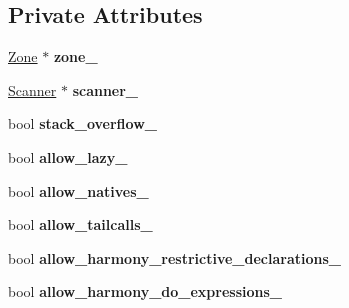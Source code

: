 \subsection*{Private Attributes}
\begin{DoxyCompactItemize}
\item 
\hyperlink{classv8_1_1internal_1_1_zone}{Zone} $\ast$ {\bfseries zone\+\_\+}\hypertarget{classv8_1_1internal_1_1_parser_base_a8bd81faa574f7a7b338ce703bf5e2490}{}\label{classv8_1_1internal_1_1_parser_base_a8bd81faa574f7a7b338ce703bf5e2490}

\item 
\hyperlink{classv8_1_1internal_1_1_scanner}{Scanner} $\ast$ {\bfseries scanner\+\_\+}\hypertarget{classv8_1_1internal_1_1_parser_base_a3c0583223a3cc5a1fef064d80ad15e4f}{}\label{classv8_1_1internal_1_1_parser_base_a3c0583223a3cc5a1fef064d80ad15e4f}

\item 
bool {\bfseries stack\+\_\+overflow\+\_\+}\hypertarget{classv8_1_1internal_1_1_parser_base_aec73716491018696272b3eca6802c5a4}{}\label{classv8_1_1internal_1_1_parser_base_aec73716491018696272b3eca6802c5a4}

\item 
bool {\bfseries allow\+\_\+lazy\+\_\+}\hypertarget{classv8_1_1internal_1_1_parser_base_a4960f45b6542c43e3df412d35061885c}{}\label{classv8_1_1internal_1_1_parser_base_a4960f45b6542c43e3df412d35061885c}

\item 
bool {\bfseries allow\+\_\+natives\+\_\+}\hypertarget{classv8_1_1internal_1_1_parser_base_a295eaf34ec7b229ec88633dfae1be028}{}\label{classv8_1_1internal_1_1_parser_base_a295eaf34ec7b229ec88633dfae1be028}

\item 
bool {\bfseries allow\+\_\+tailcalls\+\_\+}\hypertarget{classv8_1_1internal_1_1_parser_base_a399c27c5b2e8fb5989c1c23bb4b563e0}{}\label{classv8_1_1internal_1_1_parser_base_a399c27c5b2e8fb5989c1c23bb4b563e0}

\item 
bool {\bfseries allow\+\_\+harmony\+\_\+restrictive\+\_\+declarations\+\_\+}\hypertarget{classv8_1_1internal_1_1_parser_base_a67452c39f6f9a5b2e6dceff101ca20a1}{}\label{classv8_1_1internal_1_1_parser_base_a67452c39f6f9a5b2e6dceff101ca20a1}

\item 
bool {\bfseries allow\+\_\+harmony\+\_\+do\+\_\+expressions\+\_\+}\hypertarget{classv8_1_1internal_1_1_parser_base_a1de52fab381c5d3ab1cd6e07dd367bad}{}\label{classv8_1_1internal_1_1_parser_base_a1de52fab381c5d3ab1cd6e07dd367bad}


\end{DoxyCompactItemize}
